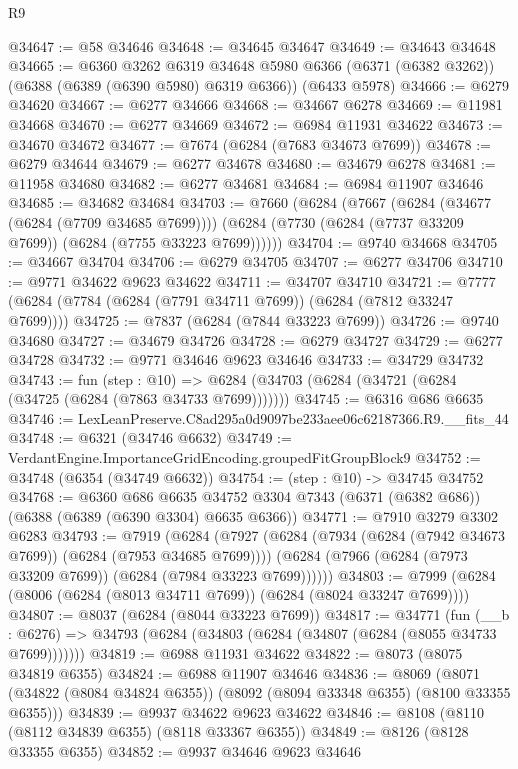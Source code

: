 \begin{lexlean}{R9}
\begin{coremodule}
@34647 := @58 @34646
@34648 := @34645 @34647
@34649 := @34643 @34648
@34665 := @6360
    @3262
    @6319
    @34648
    @5980
    @6366
    (@6371 (@6382 @3262))
    (@6388 (@6389 (@6390 @5980) @6319 @6366))
    (@6433 @5978)
@34666 := @6279 @34620
@34667 := @6277 @34666
@34668 := @34667 @6278
@34669 := @11981 @34668
@34670 := @6277 @34669
@34672 := @6984 @11931 @34622
@34673 := @34670 @34672
@34677 := @7674 (@6284 (@7683 @34673 @7699))
@34678 := @6279 @34644
@34679 := @6277 @34678
@34680 := @34679 @6278
@34681 := @11958 @34680
@34682 := @6277 @34681
@34684 := @6984 @11907 @34646
@34685 := @34682 @34684
@34703 := @7660
    (@6284
      (@7667
        (@6284 (@34677 (@6284 (@7709 @34685 @7699))))
        (@6284 (@7730 (@6284 (@7737 @33209 @7699)) (@6284 (@7755 @33223 @7699))))))
@34704 := @9740 @34668
@34705 := @34667 @34704
@34706 := @6279 @34705
@34707 := @6277 @34706
@34710 := @9771 @34622 @9623 @34622
@34711 := @34707 @34710
@34721 := @7777 (@6284 (@7784 (@6284 (@7791 @34711 @7699)) (@6284 (@7812 @33247 @7699))))
@34725 := @7837 (@6284 (@7844 @33223 @7699))
@34726 := @9740 @34680
@34727 := @34679 @34726
@34728 := @6279 @34727
@34729 := @6277 @34728
@34732 := @9771 @34646 @9623 @34646
@34733 := @34729 @34732
@34743 := fun (step : @10) =>
  @6284 (@34703 (@6284 (@34721 (@6284 (@34725 (@6284 (@7863 @34733 @7699)))))))
@34745 := @6316 @686 @6635
@34746 := LexLeanPreserve.C8ad295a0d9097be233aee06c62187366.R9.__fits_44
@34748 := @6321 (@34746 @6632)
@34749 := VerdantEngine.ImportanceGridEncoding.groupedFitGroupBlock9
@34752 := @34748 (@6354 (@34749 @6632))
@34754 := (step : @10) -> @34745 @34752
@34768 := @6360
    @686
    @6635
    @34752
    @3304
    @7343
    (@6371 (@6382 @686))
    (@6388 (@6389 (@6390 @3304) @6635 @6366))
@34771 := @7910 @3279 @3302 @6283
@34793 := @7919
    (@6284
      (@7927
        (@6284 (@7934 (@6284 (@7942 @34673 @7699)) (@6284 (@7953 @34685 @7699))))
        (@6284 (@7966 (@6284 (@7973 @33209 @7699)) (@6284 (@7984 @33223 @7699))))))
@34803 := @7999 (@6284 (@8006 (@6284 (@8013 @34711 @7699)) (@6284 (@8024 @33247 @7699))))
@34807 := @8037 (@6284 (@8044 @33223 @7699))
@34817 := @34771
    (fun (__b : @6276) => @34793 (@6284 (@34803 (@6284 (@34807 (@6284 (@8055 @34733 @7699)))))))
@34819 := @6988 @11931 @34622
@34822 := @8073 (@8075 @34819 @6355)
@34824 := @6988 @11907 @34646
@34836 := @8069
    (@8071 (@34822 (@8084 @34824 @6355)) (@8092 (@8094 @33348 @6355) (@8100 @33355 @6355)))
@34839 := @9937 @34622 @9623 @34622
@34846 := @8108 (@8110 (@8112 @34839 @6355) (@8118 @33367 @6355))
@34849 := @8126 (@8128 @33355 @6355)
@34852 := @9937 @34646 @9623 @34646

\end{coremodule}
\end{lexlean}
